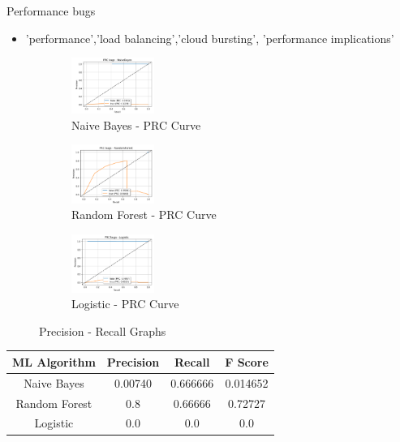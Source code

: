\documentclass{seal_article}
\begin{document}
\vspace{0.5cm}
Performance bugs

\begin{itemize}
\item  'performance','load balancing','cloud bursting', 'performance implications'
\end{itemize}


\vspace{0.5cm}
\begin{figure}[h] 
\centering
\captionsetup{justification=centering}
\begin{subfigure}{.3\linewidth}
  \centering
  \includegraphics[width=2.7cm]{img/naive_prc.PNG}
  \caption{Naive Bayes - PRC Curve}
  \label{fig:sub1}
\end{subfigure}
\begin{subfigure}{.3\linewidth}
  \centering
  \includegraphics[width=2.7cm]{img/random_forest_performance.PNG}
  \caption{Random Forest - PRC Curve}
  \label{fig:sub1}
\end{subfigure}
\begin{subfigure}{.3\linewidth}
  \centering
  \includegraphics[width=2.7cm]{img/logistic_performance.PNG}
  \caption{Logistic - PRC Curve}
  \label{fig:sub2}
\end{subfigure}
\caption{Precision - Recall Graphs}
\label{fig.aug}
\end{figure} 
\begin{center}
 \begin{tabular}{||c c c c||} 
 \hline
 ML Algorithm &Precision & Recall & F Score   \\ [0.5ex] 
 \hline\hline
  Naive Bayes & 0.00740 & 0.666666 & 0.014652\\ 
 \hline
 Random Forest &  0.8 & 0.66666 & 0.72727 \\
 \hline
 Logistic & 0.0 & 0.0 & 0.0 \\
 \hline
\end{tabular}
\end{center}
\end{document}
